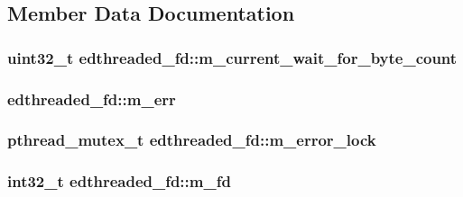 \subsection{Member Data Documentation}
\hypertarget{classedthreaded__fd_a42482e8096aed090ead1f08f049a24e6}{
\subsubsection[{m\-\_\-current\-\_\-wait\-\_\-for\-\_\-byte\-\_\-count}]{\setlength{\rightskip}{0pt plus 5cm}uint32\-\_\-t edthreaded\-\_\-fd\-::m\-\_\-current\-\_\-wait\-\_\-for\-\_\-byte\-\_\-count\hspace{0.3cm}{\ttfamily [protected]}}}\label{classedthreaded__fd_a42482e8096aed090ead1f08f049a24e6}
\hypertarget{classedthreaded__fd_a74eb86ee72a5dfa499e0529ac59955b0}{
\subsubsection[{m\-\_\-err}]{ edthreaded\-\_\-fd\-::m\-\_\-err\hspace{0.3cm}{\ttfamily [protected]}}}\label{classedthreaded__fd_a74eb86ee72a5dfa499e0529ac59955b0}
\hypertarget{classedthreaded__fd_a407c7283668e38cefb828a3f4f4ec117}{
\subsubsection[{m\-\_\-error\-\_\-lock}]{\setlength{\rightskip}{0pt plus 5cm}pthread\-\_\-mutex\-\_\-t edthreaded\-\_\-fd\-::m\-\_\-error\-\_\-lock\hspace{0.3cm}{\ttfamily [protected]}}}\label{classedthreaded__fd_a407c7283668e38cefb828a3f4f4ec117}
\hypertarget{classedthreaded__fd_aec9e15343d8764eae71949abfb72aae6}{
\subsubsection[{m\-\_\-fd}]{\setlength{\rightskip}{0pt plus 5cm}int32\-\_\-t edthreaded\-\_\-fd\-::m\-\_\-fd\hspace{0.3cm}{\ttfamily [protected]}}}\label{classedthreaded__fd_aec9e15343d8764eae71949abfb72aae6}
